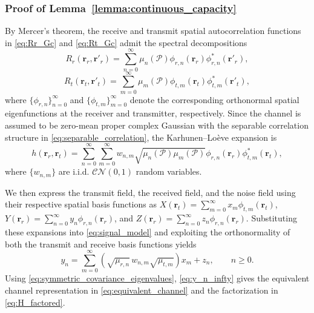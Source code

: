 \documentclass[lettersize,journal]{IEEEtran}
\theoremstyle{plain}
\begin{document}
\subsubsection{Proof of Lemma~\ref{lemma:continuous_capacity}}
By Mercer's theorem, the receive and transmit spatial autocorrelation
functions in \eqref{eq:Rr_Gc} and \eqref{eq:Rt_Gc} admit the spectral
decompositions
$$
	R_r(\mathbf{r}_r,\mathbf{r}'_r)
	=
	\sum_{n=0}^{\infty}
	\mu_n(\mathcal{P})
	\phi_{r,n}(\mathbf{r}_r)
	\phi_{r,n}^{*}(\mathbf{r}'_r),
	\label{eq:Rr_mercer}
$$
$$
	R_t(\mathbf{r}_t,\mathbf{r}'_t)
	=
	\sum_{m=0}^{\infty}
	\mu_m(\mathcal{P})
	\phi_{t,m}(\mathbf{r}_t)
	\phi_{t,m}^{*}(\mathbf{r}'_t),
	\label{eq:Rt_mercer}
$$
where $\{\phi_{r,n}\}_{n=0}^{\infty}$ and
$\{\phi_{t,m}\}_{m=0}^{\infty}$ denote the corresponding
orthonormal spatial eigenfunctions at the receiver and transmitter,
respectively. Since the channel is assumed to be zero-mean proper complex Gaussian with the separable correlation structure in
\eqref{eq:separable_correlation}, the Karhunen--Lo\`eve expansion is
$$
	h(\mathbf{r}_r,\mathbf{r}_t)
	=
	\sum_{n=0}^{\infty}
	\sum_{m=0}^{\infty}
	w_{n,m}
	\sqrt{\mu_n(\mathcal{P})\mu_m(\mathcal{P})}
	\phi_{r,n}(\mathbf{r}_r)
	\phi_{t,m}^{*}(\mathbf{r}_t),
	\label{eq:h_infinite_series}
$$
where $\{w_{n,m}\}$ are i.i.d. $\mathcal{CN}(0,1)$ random variables.

We then express the transmit field, the received field, and the noise
field using their respective spatial basis functions as
$X(\mathbf{r}_t)=\sum_{m=0}^{\infty}x_m\phi_{t,m}(\mathbf{r}_t)$,
$Y(\mathbf{r}_r)=\sum_{n=0}^{\infty}y_n\phi_{r,n}(\mathbf{r}_r)$,
and
$Z(\mathbf{r}_r)=\sum_{n=0}^{\infty}z_n\phi_{r,n}(\mathbf{r}_r)$.
Substituting these expansions into \eqref{eq:signal_model} and
exploiting the orthonormality of both the transmit and receive basis
functions yields
\begin{equation}
	y_n
	=
	\sum_{m=0}^{\infty}
	\left(
	\sqrt{\mu_{r,n}}\,w_{n,m}\sqrt{\mu_{t,m}}
	\right)x_m+z_n,
	\qquad n\geq0.
	\label{eq:y_n_infty}
\end{equation}
Using \eqref{eq:symmetric_covariance_eigenvalues},
\eqref{eq:y_n_infty} gives the equivalent channel representation in
\eqref{eq:equivalent_channel} and the factorization in
\eqref{eq:H_factored}.
\end{document}
